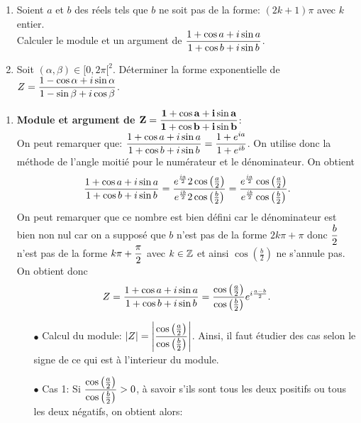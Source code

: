 \documentclass[a4paper, 11pt]{article}
\begin{document}
\begin{exercice}  \;
\begin{enumerate}
\item Soient $a$ et $b$ des r\'eels tels que $b$ ne soit pas de la forme: $(2k+1)\pi$ avec $k$ entier.\\
\noindent Calculer le module et un argument de $\displaystyle\frac{1+\cos{a}+i\sin{a}}{1+\cos{b}+i\sin{b}}$.
\item Soit $(\alpha,\beta)\in\lbrack 0,2\pi\lbrack^2$. D\'eterminer la forme exponentielle de $Z=\displaystyle\frac{1-\cos \alpha +i\sin \alpha }{1-\sin \beta +i\cos \beta}$.
\end{enumerate}
\end{exercice}


\begin{correction}   \;
\begin{enumerate}
\item \textbf{Module et argument de $\mathbf{Z=\displaystyle\frac{1+\cos{a}+i\sin{a}  }{ 1+\cos{b}+i\sin{b}  }}$}:\\
On peut remarquer que: $\displaystyle\frac{1+\cos{a}+i\sin{a}  }{ 1+\cos{b}+i\sin{b}  }= \displaystyle\frac{ 1+e^{ia}  }{1+e^{ib}}$. On utilise donc la m\'ethode de l'angle moiti\'e pour le num\'erateur et le d\'enominateur. On obtient
$$\displaystyle\frac{1+\cos{a}+i\sin{a}  }{ 1+\cos{b}+i\sin{b}  }= \displaystyle\frac{ e^{\frac{ia}{2}}   2\cos{\left( \frac{a}{2}\right)}  }{ e^{\frac{ib}{2}}   2\cos{\left( \frac{b}{2}\right)}   }=\displaystyle\frac{ e^{\frac{ia}{2}}   \cos{\left( \frac{a}{2}\right)}  }{ e^{\frac{ib}{2}}   \cos{\left( \frac{b}{2}\right)}   }.$$
On peut remarquer que ce nombre est bien d\'efini car le d\'enominateur est bien non nul car on a suppos\'e que $b$ n'est pas de la forme $2k\pi+\pi$ donc $\displaystyle\frac{b}{2}$ n'est pas de la forme $k\pi+\displaystyle\frac{\pi}{2}$ avec $k\in\mathbb{Z}$ et ainsi $\cos{\left( \frac{b}{2}\right)} $ ne s'annule pas. On obtient donc
$$Z=\displaystyle\frac{1+\cos{a}+i\sin{a}  }{ 1+\cos{b}+i\sin{b}  }=\displaystyle\frac{ \cos{\left( \frac{a}{2}\right)}  }{   \cos{\left( \frac{b}{2}\right)}  } e^{i\frac{a-b}{2}}.$$
\begin{itemize}
\item[$\bullet$] Calcul du module: $|Z|= \left| \displaystyle\frac{ \cos{\left( \frac{a}{2}\right)}  }{   \cos{\left( \frac{b}{2}\right)}  }   \right|$. Ainsi, il faut \'etudier des cas selon le signe de ce qui est \`{a} l'interieur du module.
\item[$\bullet$] Cas 1: Si $ \displaystyle\frac{ \cos{\left( \frac{a}{2}\right)}  }{   \cos{\left( \frac{b}{2}\right)}  } >0$, \`{a} savoir s'ils sont tous les deux positifs ou tous les deux n\'egatifs, on obtient alors:

\end{itemize}
\end{enumerate}
\end{correction}
\end{document}
